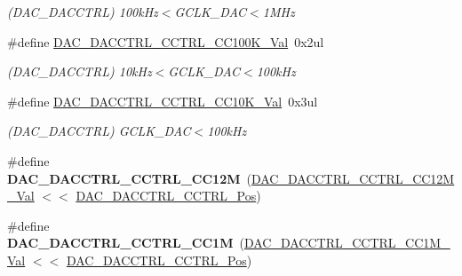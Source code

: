 \begin{DoxyCompactItemize}
\begin{DoxyCompactList}\small\item\em (D\+A\+C\+\_\+\+D\+A\+C\+C\+T\+R\+L) 100k\+Hz$<$G\+C\+L\+K\+\_\+\+D\+A\+C$<$1\+M\+Hz \end{DoxyCompactList}\item 
\hypertarget{group___s_a_m_l21___d_a_c_ga64aa7d99ee21bf0fcc63c55df258a865}{}\#define \hyperlink{group___s_a_m_l21___d_a_c_ga64aa7d99ee21bf0fcc63c55df258a865}{D\+A\+C\+\_\+\+D\+A\+C\+C\+T\+R\+L\+\_\+\+C\+C\+T\+R\+L\+\_\+\+C\+C100\+K\+\_\+\+Val}~0x2ul\label{group___s_a_m_l21___d_a_c_ga64aa7d99ee21bf0fcc63c55df258a865}

\begin{DoxyCompactList}\small\item\em (D\+A\+C\+\_\+\+D\+A\+C\+C\+T\+R\+L) 10k\+Hz$<$G\+C\+L\+K\+\_\+\+D\+A\+C$<$100k\+Hz \end{DoxyCompactList}\item 
\hypertarget{group___s_a_m_l21___d_a_c_gaa2391a15778507e58f38981575433508}{}\#define \hyperlink{group___s_a_m_l21___d_a_c_gaa2391a15778507e58f38981575433508}{D\+A\+C\+\_\+\+D\+A\+C\+C\+T\+R\+L\+\_\+\+C\+C\+T\+R\+L\+\_\+\+C\+C10\+K\+\_\+\+Val}~0x3ul\label{group___s_a_m_l21___d_a_c_gaa2391a15778507e58f38981575433508}

\begin{DoxyCompactList}\small\item\em (D\+A\+C\+\_\+\+D\+A\+C\+C\+T\+R\+L) G\+C\+L\+K\+\_\+\+D\+A\+C$<$100k\+Hz \end{DoxyCompactList}\item 
\hypertarget{group___s_a_m_l21___d_a_c_ga063ea40425fabd90ab37345e818bc448}{}\#define {\bfseries D\+A\+C\+\_\+\+D\+A\+C\+C\+T\+R\+L\+\_\+\+C\+C\+T\+R\+L\+\_\+\+C\+C12\+M}~(\hyperlink{group___s_a_m_l21___d_a_c_ga47d57d2b4da612791e27d9e1a5574926}{D\+A\+C\+\_\+\+D\+A\+C\+C\+T\+R\+L\+\_\+\+C\+C\+T\+R\+L\+\_\+\+C\+C12\+M\+\_\+\+Val}   $<$$<$ \hyperlink{group___s_a_m_l21___d_a_c_ga99c14926d2b1e10dcdf3495435242fb2}{D\+A\+C\+\_\+\+D\+A\+C\+C\+T\+R\+L\+\_\+\+C\+C\+T\+R\+L\+\_\+\+Pos})\label{group___s_a_m_l21___d_a_c_ga063ea40425fabd90ab37345e818bc448}

\item 
\hypertarget{group___s_a_m_l21___d_a_c_gaa44915d6d3ba67e9b5f5cd95c91f0dda}{}\#define {\bfseries D\+A\+C\+\_\+\+D\+A\+C\+C\+T\+R\+L\+\_\+\+C\+C\+T\+R\+L\+\_\+\+C\+C1\+M}~(\hyperlink{group___s_a_m_l21___d_a_c_ga0eae47cb1607b2737281a3839708581f}{D\+A\+C\+\_\+\+D\+A\+C\+C\+T\+R\+L\+\_\+\+C\+C\+T\+R\+L\+\_\+\+C\+C1\+M\+\_\+\+Val}    $<$$<$ \hyperlink{group___s_a_m_l21___d_a_c_ga99c14926d2b1e10dcdf3495435242fb2}{D\+A\+C\+\_\+\+D\+A\+C\+C\+T\+R\+L\+\_\+\+C\+C\+T\+R\+L\+\_\+\+Pos})\label{group___s_a_m_l21___d_a_c_gaa44915d6d3ba67e9b5f5cd95c91f0dda}


\end{DoxyCompactItemize}
